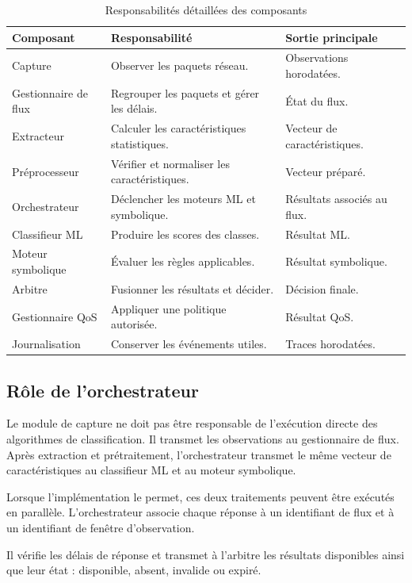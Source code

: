 \begin{table}[H]
\centering
\caption{Responsabilités détaillées des composants}
\label{tab:responsabilites_modules}
\begin{tabularx}{\textwidth}{|l|X|X|}
\hline
\textbf{Composant} & \textbf{Responsabilité} & \textbf{Sortie principale} \\
\hline
Capture & Observer les paquets réseau. & Observations horodatées. \\
\hline
Gestionnaire de flux & Regrouper les paquets et gérer les délais. & État du flux. \\
\hline
Extracteur & Calculer les caractéristiques statistiques. & Vecteur de caractéristiques. \\
\hline
Préprocesseur & Vérifier et normaliser les caractéristiques. & Vecteur préparé. \\
\hline
Orchestrateur & Déclencher les moteurs ML et symbolique. & Résultats associés au flux. \\
\hline
Classifieur ML & Produire les scores des classes. & Résultat ML. \\
\hline
Moteur symbolique & Évaluer les règles applicables. & Résultat symbolique. \\
\hline
Arbitre & Fusionner les résultats et décider. & Décision finale. \\
\hline
Gestionnaire QoS & Appliquer une politique autorisée. & Résultat QoS. \\
\hline
Journalisation & Conserver les événements utiles. & Traces horodatées. \\
\hline
\end{tabularx}
\end{table}

\subsection{Rôle de l'orchestrateur}

Le module de capture ne doit pas être responsable de
l'exécution directe des algorithmes de classification.
Il transmet les observations au gestionnaire de flux.
Après extraction et prétraitement, l'orchestrateur
transmet le même vecteur de caractéristiques au
classifieur ML et au moteur symbolique.

Lorsque l'implémentation le permet, ces deux traitements
peuvent être exécutés en parallèle. L'orchestrateur
associe chaque réponse à un identifiant de flux et à
un identifiant de fenêtre d'observation.

Il vérifie les délais de réponse et transmet à l'arbitre
les résultats disponibles ainsi que leur état :
disponible, absent, invalide ou expiré.

